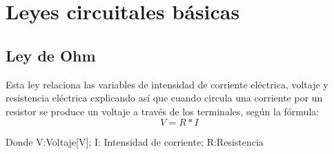 
\section{Leyes circuitales básicas}






\subsection{Ley de Ohm}
Esta ley relaciona las variables de intensidad de corriente eléctrica, voltaje y resistencia eléctrica explicando así que cuando circula una corriente por un resistor se produce un voltaje a  través de los terminales, según la fórmula:\begin{equation*}
V=R*I
\label{fig:vir_ohm}
\end{equation*}

Donde V:Voltaje[V]; I: Intensidad de corriente; R:Resistencia






